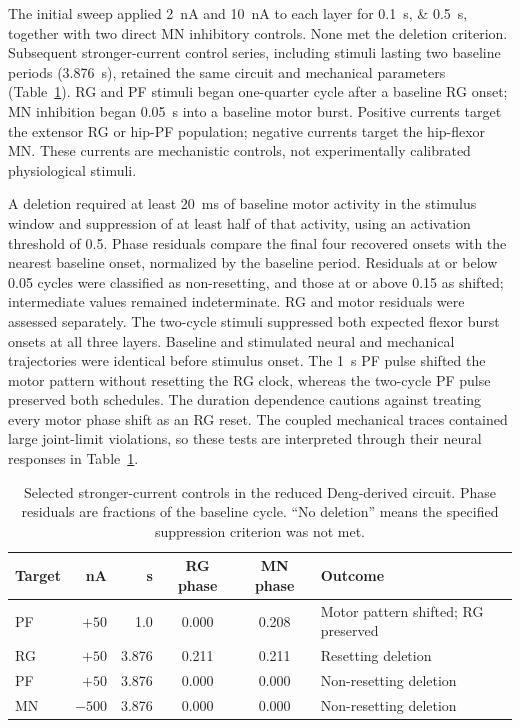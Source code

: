 The initial sweep applied \qty{+2}{\nano\ampere} and \qty{+10}{\nano\ampere} to each layer for \qtylist{0.1;0.5}{\second}, together with two direct MN inhibitory controls. None met the deletion criterion. Subsequent stronger-current control series, including stimuli lasting two baseline periods (\qty{3.876}{\second}), retained the same circuit and mechanical parameters (Table~\ref{tab:layer_stimulus}). RG and PF stimuli began one-quarter cycle after a baseline RG onset; MN inhibition began \qty{0.05}{\second} into a baseline motor burst. Positive currents target the extensor RG or hip-PF population; negative currents target the hip-flexor MN. These currents are mechanistic controls, not experimentally calibrated physiological stimuli.

A deletion required at least \qty{20}{\milli\second} of baseline motor activity in the stimulus window and suppression of at least half of that activity, using an activation threshold of 0.5. Phase residuals compare the final four recovered onsets with the nearest baseline onset, normalized by the baseline period. Residuals at or below 0.05 cycles were classified as non-resetting, and those at or above 0.15 as shifted; intermediate values remained indeterminate. RG and motor residuals were assessed separately. The two-cycle stimuli suppressed both expected flexor burst onsets at all three layers. Baseline and stimulated neural and mechanical trajectories were identical before stimulus onset. The \qty{1}{\second} PF pulse shifted the motor pattern without resetting the RG clock, whereas the two-cycle PF pulse preserved both schedules. The duration dependence cautions against treating every motor phase shift as an RG reset. The coupled mechanical traces contained large joint-limit violations, so these tests are interpreted through their neural responses in Table~\ref{tab:layer_stimulus}.

\begin{table}[htbp]
\centering\small
\caption[Layer-specific stimulation controls]{Selected stronger-current controls in the reduced Deng-derived circuit. Phase residuals are fractions of the baseline cycle. ``No deletion'' means the specified suppression criterion was not met.}
\label{tab:layer_stimulus}
\begin{tabularx}{\textwidth}{@{}lrrcc>{\raggedright\arraybackslash}X@{}}
\toprule
Target & \unit{\nano\ampere} & \unit{\second} & RG phase & MN phase & Outcome \\
\midrule
PF & $+50$ & 1.0 & 0.000 & 0.208 & Motor pattern shifted; RG preserved \\
RG & $+50$ & 3.876 & 0.211 & 0.211 & Resetting deletion \\
PF & $+50$ & 3.876 & 0.000 & 0.000 & Non-resetting deletion \\
MN & $-500$ & 3.876 & 0.000 & 0.000 & Non-resetting deletion \\
\bottomrule
\end{tabularx}
\end{table}



